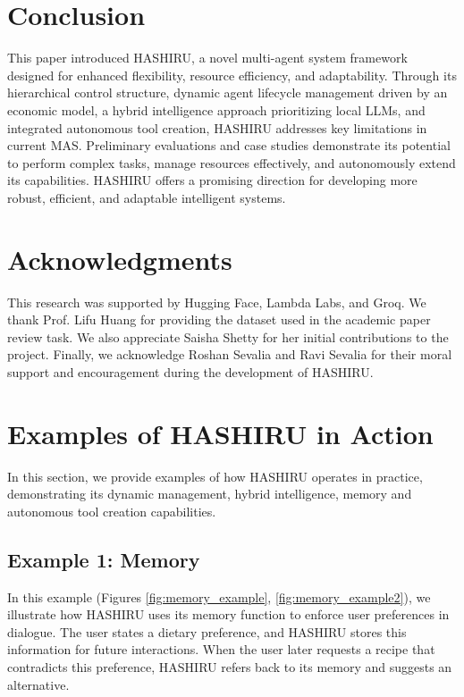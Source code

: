 \documentclass[conference]{IEEEtran}
\begin{document}
\section{Conclusion}
\label{sec:conclusion}

This paper introduced HASHIRU, a novel multi-agent system framework designed for enhanced flexibility, resource efficiency, and adaptability. Through its hierarchical control structure, dynamic agent lifecycle management driven by an economic model, a hybrid intelligence approach prioritizing local LLMs, and integrated autonomous tool creation, HASHIRU addresses key limitations in current MAS. Preliminary evaluations and case studies demonstrate its potential to perform complex tasks, manage resources effectively, and autonomously extend its capabilities. HASHIRU offers a promising direction for developing more robust, efficient, and adaptable intelligent systems.

\section*{Acknowledgments}
This research was supported by Hugging Face, Lambda Labs, and Groq. We thank Prof. Lifu Huang for providing the dataset used in the academic paper review task. We also appreciate Saisha Shetty for her initial contributions to the project. Finally, we acknowledge Roshan Sevalia and Ravi Sevalia for their moral support and encouragement during the development of HASHIRU.



\appendix
\section{Examples of HASHIRU in Action}
\label{sec:examples}
In this section, we provide examples of how HASHIRU operates in practice, demonstrating its dynamic management, hybrid intelligence, memory and autonomous tool creation capabilities.

\subsection{Example 1: Memory}
In this example (Figures \ref{fig:memory_example}, \ref{fig:memory_example2}), we illustrate how HASHIRU uses its memory function to enforce user preferences in dialogue. The user states a dietary preference, and HASHIRU stores this information for future interactions. When the user later requests a recipe that contradicts this preference, HASHIRU refers back to its memory and suggests an alternative.
\end{document}
